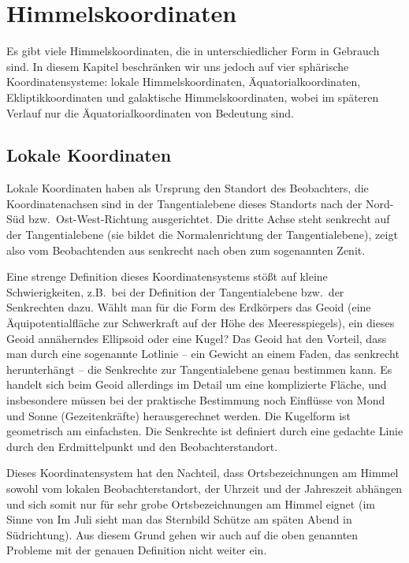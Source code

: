 \section{Himmelskoordinaten}

Es gibt viele Himmelskoordinaten, die in unterschiedlicher Form in Gebrauch sind. In diesem
Kapitel beschr\"anken wir uns jedoch auf vier sph\"arische Koordinatensysteme: lokale Himmelskoordinaten,
\"Aquatorialkoordinaten, Ekliptikkoordinaten und galaktische Himmelskoordinaten, wobei im sp\"ateren
Verlauf nur die \"Aquatorialkoordinaten von Bedeutung sind.  

\subsection{Lokale Koordinaten}

Lokale Koordinaten 
haben als Ursprung den Standort des Beobachters, die
Koordinatenachsen sind in der Tangentialebene dieses Standorts nach der Nord-S\"ud bzw.\
Ost-West-Richtung ausgerichtet. Die dritte Achse steht senkrecht auf der Tangentialebene (sie
bildet die Normalenrichtung der Tangentialebene),
zeigt also vom Beobachtenden aus senkrecht nach oben zum sogenannten Zenit. 

Eine strenge Definition dieses Koordinatensystems st\"o\ss t auf kleine Schwierigkeiten,
z.B.\ bei der Definition der Tangentialebene bzw.\ der Senkrechten dazu. W\"ahlt man f\"ur die Form des
Erdk\"orpers das Geoid\index{Geoid} 
(eine \"Aquipotentialfl\"ache zur Schwerkraft auf der H\"ohe des
Meeresspiegels), ein dieses Geoid ann\"aherndes Ellipsoid oder eine Kugel? Das Geoid hat den
Vorteil, dass man durch eine sogenannte\index{Lotlinie} 
Lotlinie -- ein Gewicht an einem Faden, das senkrecht
herunterh\"angt -- die Senkrechte zur Tangentialebene genau bestimmen kann. Es handelt sich beim
Geoid allerdings im Detail um eine komplizierte Fl\"ache, und insbesondere m\"ussen bei der
praktische Bestimmung noch Einfl\"usse von Mond und Sonne (Gezeitenkr\"afte) herausgerechnet
werden. Die Kugelform ist geometrisch am einfachsten. Die Senkrechte ist definiert durch eine
gedachte Linie durch den Erdmittelpunkt und den Beobachterstandort. 

Dieses Koordinatensystem hat den Nachteil, dass Ortsbezeichnungen am Himmel sowohl
vom lokalen Beobachterstandort, der Uhrzeit und der Jahreszeit abh\"angen und sich somit
nur f\"ur sehr grobe Ortsbezeichnungen am Himmel eignet (im Sinne von \glqq Im Juli sieht man 
das Sternbild Sch\"utze am sp\"aten Abend in S\"udrichtung\grqq). Aus diesem Grund gehen wir
auch auf die oben genannten Probleme mit der genauen Definition nicht weiter ein.

